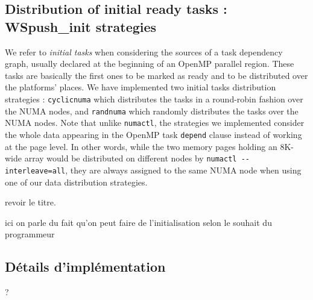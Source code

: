\subsection{Distribution of initial ready tasks : WSpush\_init strategies}
\label{sec:ws_push_init}
We refer to \emph{initial tasks} when considering the sources of a task dependency graph, usually declared at the beginning of an OpenMP parallel region.
These tasks are basically the first ones to be marked as ready and to be distributed over the platforms' places.
We have implemented two initial tasks distribution strategies : \verb!cyclicnuma! which distributes the tasks in a round-robin fashion over the NUMA nodes, and \verb!randnuma! which randomly distributes the tasks over the NUMA nodes.
Note that unlike \verb!numactl!, the strategies we implemented consider the whole data appearing in the OpenMP task \verb!depend! clause instead of working at the page level. In other words, while the two memory pages holding an 8K-wide array would be distributed on different nodes by \verb!numactl --interleave=all!, they are always assigned to the same NUMA node when using one of our data distribution strategies.


revoir le titre.

ici on parle du fait qu'on peut faire de l'initialisation selon le souhait du programmeur

\subsection{Détails d'implémentation}

?
